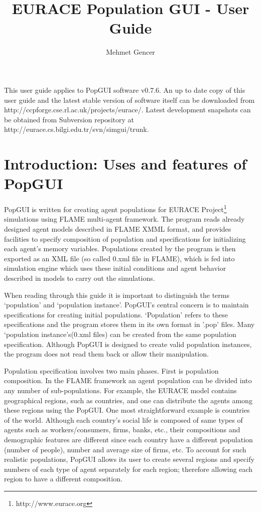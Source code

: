 \documentclass{article}
\begin{document}
\newcommand{\example}[1]{``{\tt #1}''}
\newcommand{\screenshot}[1]{\texttt{[image: screenshots/\#1.jpg]}}
\newcommand{\weblink}[1]{#1}

\title{EURACE Population GUI - User Guide}
\author{Mehmet Gencer}
\maketitle

This user guide applies to PopGUI software v0.7.6. An up to date copy of this user guide and the latest stable version of software itself can be downloaded from  \weblink{http://ccpforge.cse.rl.ac.uk/projects/eurace/}. Latest development snapshots can be obtained from Subversion repository at \weblink{http://eurace.cs.bilgi.edu.tr/svn/simgui/trunk}.

\tableofcontents

\newpage
\section{Introduction: Uses and features of PopGUI}
PopGUI is written for creating agent populations for EURACE  Project\footnote{\weblink{http://www.eurace.org}} simulations using FLAME multi-agent framework. The program reads already designed agent models described in FLAME XMML format, and provides facilities to specify composition of population and specifications for initializing each agent's memory variables. Populations created by the program is then exported as an XML file (so called 0.xml file in FLAME), which is fed into simulation engine which uses these initial conditions and agent behavior described in models to carry out the simulations.

When reading through this guide it is important to distinguish the terms `population' and `population instance'. PopGUI's central concern is to maintain specifications for creating initial populations. `Population' refers to these specifications and the program stores them in its own format in '.pop' files. Many `population instance's(0.xml files) can be created from the same population specification. Although PopGUI is designed to create valid population instances, the program does not read them back or allow their manipulation.

Population specification involves two main phases. First is population composition. In the FLAME framework an agent population can be divided into any number of sub-populations. For example, the EURACE model contains geographical regions, such as countries, and one can distribute the agents among these regions using the PopGUI. One most straightforward example is countries of the world. Although each country's social life is composed of same types of agents such as workers/consumers, firms, banks, etc., their compositions and demographic features are different since each country have a different population (number of people), number and average size of firms, etc. To account for such realistic populations, PopGUI allows its user to create several regions and specify numbers of each type of agent separately for each region; therefore allowing each region to have a different composition.
\end{document}
